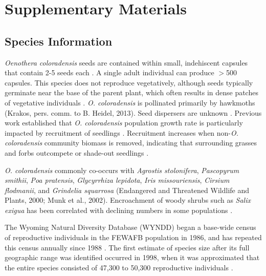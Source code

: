 \documentclass[12pt, letterpaper]{article}
\renewcommand{\thesection}{} %
\begin{document}


\newpage

\setcounter{figure}{0}
\setcounter{table}{0}
\setcounter{section}{0}
\setcounter{page}{1}


\newpage

\renewcommand{\thepage}{S\arabic{page}}
\renewcommand{\thesection}{S\arabic{section}}
\renewcommand{\thetable}{S\arabic{table}}
\renewcommand{\thefigure}{S\arabic{figure}}


\section*{Supplementary Materials}
\normalfont
\subsection{Species Information}
\textit{Oenothera coloradensis} seeds are contained within small, indehiscent capsules that contain 2-5 seeds each \cite{Burgess2005CapsuleColoradensis}. A single adult individual can produce $>$500 capsules. This species does not reproduce vegetatively, although seeds typically germinate near the base of the parent plant, which often results in dense patches of vegetative individuals \cite{Heidel202133-YearWyoming}. \textit{O. coloradensis} is pollinated primarily by hawkmoths (Krakos, pers. comm. to B. Heidel, 2013). Seed dispersers are unknown \cite{Floyd1998, Heidel202133-YearWyoming}. Previous work established that \textit{O. coloradensis} population growth rate is particularly impacted by recruitment of seedlings \cite{Floyd1998}. Recruitment increases when non-\textit{O. coloradensis} community biomass is removed, indicating that surrounding grasses and forbs outcompete or shade-out seedlings \cite{Munk2002RosetteSpecies}.
\nocite{krakosPersonalComm}

\textit{O. coloradensis} commonly co-occurs with \textit{Agrostis stolonifera}, \textit{Pascopyrum smithii}, \textit{Poa pratensis}, \textit{Glycyrrhiza lepidota}, \textit{Iris missouriensis}, \textit{Cirsium flodmanii}, and \textit{Grindelia squarrosa} (Endangered and Threatened Wildlife and Plants, 2000; Munk et al., 2002). Encroachment of woody shrubs such as \textit{Salix exigua} has been correlated with declining numbers in some populations \cite{Heidel202133-YearWyoming}.
\nocite{USFWS2019}

The Wyoming Natural Diversity Database (WYNDD) began a base-wide census of reproductive individuals in the FEWAFB population in 1986, and has repeated this census annually since 1988 \cite{Heidel202133-YearWyoming}. The first estimate of species size after its full geographic range was identified occurred in 1998, when it was approximated that the entire species consisted of 47,300 to 50,300 reproductive individuals \cite{Fertig2000-ow}.
\end{document}
